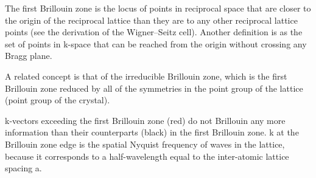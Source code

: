 The first Brillouin zone is the locus of points in reciprocal space that are closer to the origin of the reciprocal lattice than they are to any other reciprocal lattice points (see the derivation of the Wigner–Seitz cell). Another definition is as the set of points in k-space that can be reached from the origin without crossing any Bragg plane.

A related concept is that of the irreducible Brillouin zone, which is the first Brillouin zone reduced by all of the symmetries in the point group of the lattice (point group of the crystal).

k-vectors exceeding the first Brillouin zone (red) do not Brillouin any more information than their counterparts (black) in the first Brillouin zone. k at the Brillouin zone edge is the spatial Nyquist frequency of waves in the lattice, because it corresponds to a half-wavelength equal to the inter-atomic lattice spacing a.


